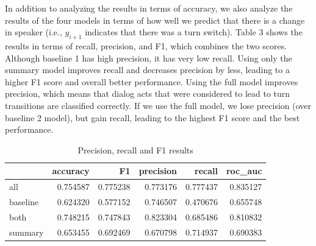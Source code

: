 In addition to analyzing the results in terms of accuracy, we also analyze the results of the four models in terms of how well we predict that there is a change in speaker (i.e., $y_{i+1}$  indicates that there was a turn switch).  Table 3 shows the results in terms of recall, precision, and F1, which combines the two scores.  Although baseline 1 has high precision, it has very low recall. Using only the summary model improves recall and decreases precision by less,
leading to a higher F1 score and overall better performance. Using the full model improves precision, which means that dialog acts
that were considered to lead to turn transitions are classified correctly. If we use the full model, we lose precision (over baseline 2 model), but gain recall,
leading to the highest F1 score and the best performance.
%
\begin{table}[ht!]
\begin{center}
\begin{tabular}{lrrrrr}
\toprule
{} &  accuracy &        F1 &  precision &    recall &   roc\_auc \\
\midrule
all      &  0.754587 &  0.775238 &   0.773176 &  0.777437 &  0.835127 \\
baseline &  0.624320 &  0.577152 &   0.746507 &  0.470676 &  0.655748 \\
both     &  0.748215 &  0.747843 &   0.823304 &  0.685486 &  0.810832 \\
summary  &  0.653455 &  0.692469 &   0.670798 &  0.714937 &  0.690383 \\
\bottomrule
\end{tabular}
\end{center}
\caption{Precision, recall and F1 results }
\end{table}



